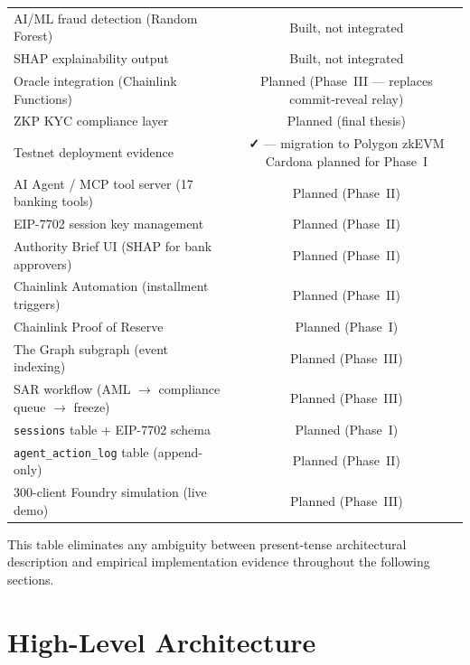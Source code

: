 \documentclass[12pt,a4paper]{report}
\newcommand{\tmarkDone}{\textbf{\faCheck}}
\newcommand{\tmarkPartial}{\faHourglassHalf}
\newcommand{\tmarkPlanned}{\textcolor{black!55}{\faCircle}}
\begin{document}
\begin{table}[H]
\begin{tabular}{@{}p{7.5cm}c@{}}
\rowcolor{RowShade}
AI/ML fraud detection (Random Forest) & \tmarkPartial{} Built, not integrated \\
SHAP explainability output & \tmarkPartial{} Built, not integrated \\
\rowcolor{RowShade}
Oracle integration (Chainlink Functions) & \tmarkPlanned{} Planned (Phase~III --- replaces commit-reveal relay) \\
ZKP KYC compliance layer & \tmarkPlanned{} Planned (final thesis) \\
\rowcolor{RowShade}
Testnet deployment evidence & \tmarkDone{} --- migration to Polygon zkEVM Cardona planned for Phase~I \\
AI Agent / MCP tool server (17 banking tools) & \tmarkPlanned{} Planned (Phase~II) \\
\rowcolor{RowShade}
EIP-7702 session key management & \tmarkPlanned{} Planned (Phase~II) \\
Authority Brief UI (SHAP for bank approvers) & \tmarkPlanned{} Planned (Phase~II) \\
\rowcolor{RowShade}
Chainlink Automation (installment triggers) & \tmarkPlanned{} Planned (Phase~II) \\
Chainlink Proof of Reserve & \tmarkPlanned{} Planned (Phase~I) \\
\rowcolor{RowShade}
The Graph subgraph (event indexing) & \tmarkPlanned{} Planned (Phase~III) \\
SAR workflow (AML $\to$ compliance queue $\to$ freeze) & \tmarkPlanned{} Planned (Phase~III) \\
\rowcolor{RowShade}
\texttt{sessions} table + EIP-7702 schema & \tmarkPlanned{} Planned (Phase~I) \\
\texttt{agent\_action\_log} table (append-only) & \tmarkPlanned{} Planned (Phase~II) \\
\rowcolor{RowShade}
300-client Foundry simulation (live demo) & \tmarkPlanned{} Planned (Phase~III) \\
\bottomrule
\end{tabular}
\end{table}

This table eliminates any ambiguity between present-tense architectural description and empirical implementation evidence throughout the following sections.

\section{High-Level Architecture}
\end{document}
